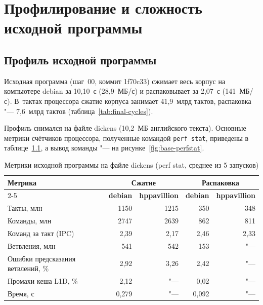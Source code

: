 \chapter{Профилирование и сложность исходной программы}

\section{Профиль исходной программы}

Исходная программа (шаг~00, коммит 1f70c33) сжимает весь корпус на
компьютере debian за 10,10~с (28,9~МБ/с) и распаковывает за 2,07~с
(141~МБ/с). В~тактах процессора сжатие корпуса занимает 41,9~млрд тактов,
распаковка "--- 7,6~млрд тактов (таблица~\ref{tab:final-cycles}).

Профиль снимался на файле dickens (10,2~МБ английского текста). Основные
метрики счётчиков процессора, полученные командой \texttt{perf stat},
приведены в таблице~\ref{tab:base-perf}, а вывод команды "--- на
рисунке~\ref{fig:base-perfstat}.

\begin{table}[H]
\caption{Метрики исходной программы на файле dickens (perf stat, среднее
из 5 запусков)}
\label{tab:base-perf}
\begin{tabletext}
\centering
\begin{tabular}{|l|r|r|r|r|}
\hline
\multirow{2}{*}{\textbf{Метрика}} & \multicolumn{2}{c|}{\textbf{Сжатие}} & \multicolumn{2}{c|}{\textbf{Распаковка}} \\
\cline{2-5}
 & \textbf{debian} & \textbf{hppavillion} & \textbf{debian} & \textbf{hppavillion} \\
\hline
Такты, млн & 1150 & 1215 & 350 & 348 \\
Команды, млн & 2747 & 2639 & 862 & 811 \\
Команд за такт (IPC) & 2,39 & 2,17 & 2,46 & 2,33 \\
Ветвления, млн & 541 & 542 & 153 & "--- \\
Ошибки предсказания ветвлений, \% & 2,92 & 3,26 & 2,42 & "--- \\
Промахи кеша L1D, \% & 2,12 & "--- & 0,02 & "--- \\
Время, с & 0,279 & "--- & 0,092 & "--- \\
\hline
\end{tabular}
\end{tabletext}
\end{table}


